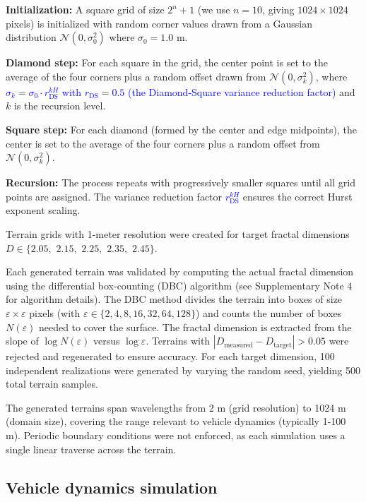 \documentclass[11pt]{article}
\begin{document}
\textbf{Initialization:} A square grid of size $2^n + 1$ (we use $n = 10$, giving $1024 \times 1024$ pixels) is initialized with random corner values drawn from a Gaussian distribution $\mathcal{N}(0, \sigma_0^2)$ where $\sigma_0 = 1.0$ m.

\textbf{Diamond step:} For each square in the grid, the center point is set to the average of the four corners plus a random offset drawn from $\mathcal{N}(0, \sigma_k^2)$, where \textcolor{blue}{$\sigma_k = \sigma_0 \cdot r_{\text{DS}}^{kH}$ with $r_{\text{DS}} = 0.5$ (the Diamond-Square variance reduction factor)} and $k$ is the recursion level.

\textbf{Square step:} For each diamond (formed by the center and edge midpoints), the center is set to the average of the four corners plus a random offset from $\mathcal{N}(0, \sigma_k^2)$.

\textbf{Recursion:} The process repeats with progressively smaller squares until all grid points are assigned. The variance reduction factor \textcolor{blue}{$r_{\text{DS}}^{kH}$} ensures the correct Hurst exponent scaling.

Terrain grids with 1-meter resolution were created for target fractal dimensions $D \in \{2.05,$ $2.15,$ $2.25,$ $2.35,$ $2.45\}$. 

Each generated terrain was validated by computing the actual fractal dimension using the differential box-counting (DBC) algorithm\cite{Sarkar1994} (see Supplementary Note 4 for algorithm details). The DBC method divides the terrain into boxes of size $\varepsilon \times \varepsilon$ pixels (with $\varepsilon \in \{2, 4, 8, 16, 32, 64, 128\}$) and counts the number of boxes $N(\varepsilon)$ needed to cover the surface. The fractal dimension is extracted from the slope of $\log N(\varepsilon)$ versus $\log \varepsilon$. Terrains with $|D_{\text{measured}} - D_{\text{target}}| > 0.05$ were rejected and regenerated to ensure accuracy. For each target dimension, 100 independent realizations were generated by varying the random seed, yielding 500 total terrain samples.

The generated terrains span wavelengths from 2 m (grid resolution) to 1024 m (domain size), covering the range relevant to vehicle dynamics (typically 1-100 m). Periodic boundary conditions were not enforced, as each simulation uses a single linear traverse across the terrain.

\subsection*{Vehicle dynamics simulation}
\end{document}
